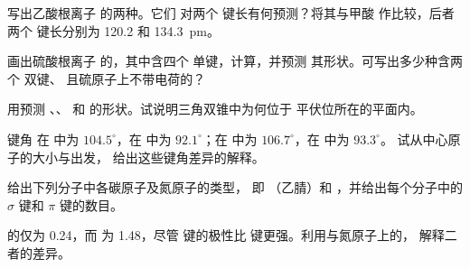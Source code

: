 \begin{exercise}[$\star\star$]\label{exo:b1:lewis-resonance-vsepr:5}
写出乙酸根离子  的两种。它们
对两个  键长有何预测？将其与甲酸
 作比较，后者两个  键长分别为 120.2 和
\qty{134.3}{pm}。
\end{exercise}

\begin{exercise}[$\star\star$]\label{exo:b1:lewis-resonance-vsepr:6}
画出硫酸根离子  的，其中含四个
 单键，计算，并预测
其形状。可写出多少种含两个  双键、
且硫原子上不带电荷的？
\end{exercise}

\begin{exercise}[$\star\star$]\label{exo:b1:lewis-resonance-vsepr:7}
用预测 、、 和
 的形状。试说明三角双锥中为何位于
平伏位所在的平面内。
\end{exercise}

\begin{exercise}[$\star\star$]\label{exo:b1:lewis-resonance-vsepr:8}
键角  在  中为 $104.5^\circ$，在
 中为 $92.1^\circ$；在  中为 $106.7^\circ$，在  中为 $93.3^\circ$。
试从中心原子的大小与出发，
给出这些键角差异的解释。
\end{exercise}

\begin{exercise}[$\star\star$]\label{exo:b1:lewis-resonance-vsepr:9}
给出下列分子中各碳原子及氮原子的类型，
即 （乙腈）和 ，并给出每个分子中的
$\sigma$ 键和 $\pi$ 键的数目。
\end{exercise}

\begin{exercise}[$\star\star\star$]\label{exo:b1:lewis-resonance-vsepr:10}
 的仅为 \qty{0.24}{\debye}，而
 为 \qty{1.48}{\debye}，尽管  键的极性比
 键更强。利用与氮原子上的，
解释二者的差异。
\end{exercise}

